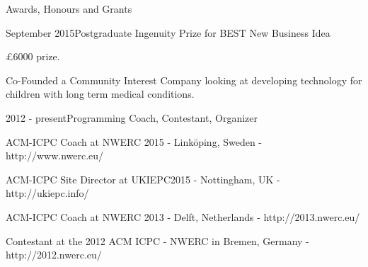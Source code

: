\documentclass{resume} %
\begin{document}
\begin{rSection}{Awards, Honours and Grants}
    \begin{rSubsection}{}{September 2015}{Postgraduate Ingenuity Prize for BEST New Business Idea}{}
        \item \pounds 6000 prize.
        \item Co-Founded a Community Interest Company looking at developing technology for children with long term medical conditions.
    \end{rSubsection}

\begin{rSubsection}{}{2012 - present}{Programming Coach, Contestant, Organizer}{}
        \item  ACM-ICPC Coach at NWERC 2015 - Linköping, Sweden - {http://www.nwerc.eu/}
        \item  ACM-ICPC Site Director at UKIEPC2015 - Nottingham, UK - {http://ukiepc.info/}
        \item  ACM-ICPC Coach at NWERC 2013 - Delft, Netherlands  - {http://2013.nwerc.eu/}
        \item Contestant at the 2012 ACM ICPC - NWERC in Bremen, Germany - {http://2012.nwerc.eu/}
    \end{rSubsection}

\end{rSection}
%
\end{document}
